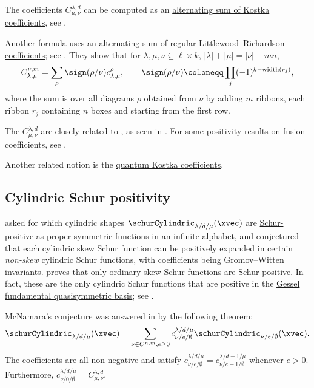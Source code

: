 The coefficients $C_{\mu,\nu}^{\lambda,d}$ can be computed as an
\hyperref[littlewoodRichardsonFromKostant]{alternating sum of Kostka coefficients},
see \cite[Cor.~1.4]{Korff2009x}.

Another formula uses an alternating sum of regular
\hyperref[littlewoodRichardsonCoefficient]{Littlewood--Richardson
coefficients}; see
\cite[Eq.~(21)]{BertramCiocanFontanineFulton1999}.
They show that for $\lambda, \mu,\nu \subseteq \ell \times k$,
$|\lambda|+|\mu| = |\nu|+mn$,
\[
C_{\lambda,\mu}^{\nu,m}
= \sum_{\rho} \sign(\rho/\nu) c^{\rho}_{\lambda,\mu}, \qquad
\sign(\rho/\nu) \coloneqq \prod_{j} (-1)^{k-\mathrm{width}(r_j)},
\]
where the sum is over all diagrams $\rho$ obtained from
$\nu$ by adding $m$ ribbons, each ribbon $r_j$ containing $n$ boxes and
starting from the first row.


The $C_{\mu,\nu}^{\lambda,d}$ are closely related to
\label{fusionCoefficient}, as seen in
\cite{Korff2009x}.
For some positivity results on fusion coefficients, see \cite{MorseSchilling2012}.


Another related notion is the \hyperref[quantumKostka]{quantum Kostka coefficients}.


\subsection[cylindricSchurPositivity]{Cylindric Schur positivity}

 \cite{McNamara2006} asked for which cylindric shapes
$\schurCylindric_{\lambda/d/\mu}(\xvec)$ are
\hyperref[schurPositivity]{Schur-positive} as proper symmetric functions in an
infinite alphabet, and conjectured that
each cylindric skew Schur function can be positively expanded in
certain \emph{non-skew} cylindric Schur functions, with coefficients being
\hyperref[gromovWittenInvariant]{Gromov--Witten invariants}.
 proves that only ordinary skew Schur functions are
Schur-positive.
In fact, these are the only cylindric Schur functions that are positive in
the \hyperref[gessel]{Gessel fundamental quasisymmetric basis}; see
\cite[Thm.~5.7]{McNamara2006}.


McNamara's conjecture was answered in \cite{Lee2017} by the following theorem:
\begin{equation*}
\schurCylindric_{\lambda/d/\mu}(\xvec) = \sum_{\nu \in C^{n,m}, e\geq 0}
c^{\lambda/d/\mu}_{\nu/e/\emptyset} \schurCylindric_{\nu/e/\emptyset}(\xvec).
\end{equation*}
The coefficients are all non-negative and satisfy
$c^{\lambda/d/\mu}_{\nu/e/\emptyset}
= c^{\lambda/d-1/\mu}_{\nu/e-1/\emptyset}$ whenever $e \gt 0$.
Furthermore, $c^{\lambda/d/\mu}_{\nu/0/\emptyset} =
C_{\mu,\nu}^{\lambda,d}$.

